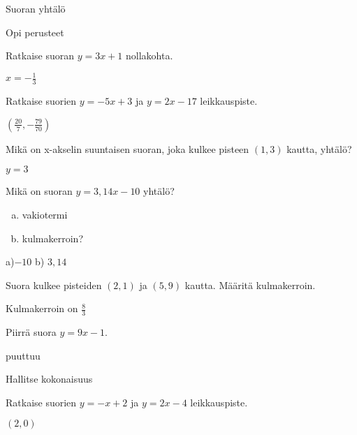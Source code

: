 Suoran yhtälö

Opi perusteet

\begin{tehtava}
Ratkaise suoran $y=3x+1$ nollakohta.
\begin{vastaus}
$x=-\frac{1}{3}$
\end{vastaus}
\end{tehtava}

\begin{tehtava}
Ratkaise suorien $y=-5x+3$ ja $y=2x-17$ leikkauspiste.
\begin{vastaus}
$(\frac{20}{7},-\frac{79}{70})$
\end{vastaus}
\end{tehtava}

\begin{tehtava}
Mikä on x-akselin suuntaisen suoran, joka kulkee pisteen $(1,3)$ kautta, yhtälö?
\begin{vastaus}
$y=3$
\end{vastaus}
\end{tehtava}

\begin{tehtava}
Mikä on suoran $y=3,14x-10$ yhtälö?
\begin{enumerate}[a)]
\item vakiotermi
\item kulmakerroin?
\end{enumerate}
\begin{vastaus}
a)$-10$ b) $3,14$
\end{vastaus}
\end{tehtava}

\begin{tehtava}
Suora kulkee pisteiden $(2,1)$ ja $(5,9)$ kautta. Määritä kulmakerroin.
\begin{vastaus}
Kulmakerroin on $\frac{8}{3}$
\end{vastaus}
\end{tehtava}

\begin{tehtava}
Piirrä suora $y=9x-1$.
\begin{vastaus}
puuttuu
\end{vastaus}
\end{tehtava}


Hallitse kokonaisuus

\begin{tehtava}
Ratkaise suorien $y=-x+2$ ja $y=2x-4$ leikkauspiste.
\begin{vastaus}
$(2,0)$
\end{vastaus}
\end{tehtava}

